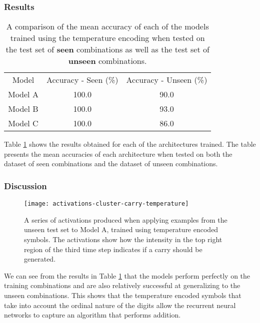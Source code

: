 \subsubsection{Results}

\begin{table}
	\center
	\caption{A comparison of the mean accuracy of each of the models trained using the temperature encoding when tested on the test set of \textbf{seen} combinations as well as the test set of \textbf{unseen} combinations.}
	\label{tab:experiment-7-results-table}
	\begin{tabular}{ |c|c|c| } 
		\hline
		Model & Accuracy - Seen (\%) & Accuracy - Unseen (\%)\\ 
		Model A & 100.0 & 90.0\\  
		Model B & 100.0 & 93.0\\  
		Model C & 100.0 & 86.0\\  
		\hline
	\end{tabular}
\end{table}

Table \ref{tab:experiment-7-results-table} shows the results obtained for each of the architectures trained. The table presents the mean accuracies of each architecture when tested on both the dataset of seen combinations and the dataset of unseen combinations. 

\subsubsection{Discussion}

\begin{figure}
	\centering
	\texttt{[image: activations-cluster-carry-temperature]}
	\caption{A series of activations produced when applying examples from the unseen test set to Model A, trained using temperature encoded symbols. The activations show how the intensity in the top right region of the third time step indicates if a carry should be generated.}%
	\label{fig:activations-cluster-carry-temperature}%
\end{figure}

We can see from the results in Table \ref{tab:experiment-7-results-table} that the models perform perfectly on the training combinations and are also relatively successful at generalizing to the unseen combinations. This shows that the temperature encoded symbols that take into account the ordinal nature of the digits allow the recurrent neural networks to capture an algorithm that performs addition.

